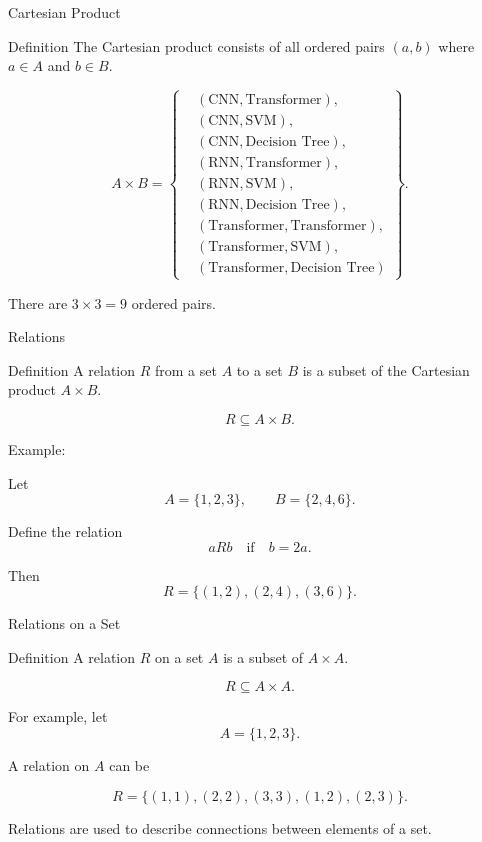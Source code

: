 \documentclass[aspectratio=169]{beamer}
\begin{document}
\begin{frame}{Cartesian Product}
\begin{block}{Definition}
The Cartesian product consists of all ordered pairs $(a,b)$ where $a\in A$ and $b\in B$.
\end{block}

\[
A\times B=
\left\{
\begin{aligned}
&(\text{CNN},\text{Transformer}),\\
&(\text{CNN},\text{SVM}),\\
&(\text{CNN},\text{Decision Tree}),\\
&(\text{RNN},\text{Transformer}),\\
&(\text{RNN},\text{SVM}),\\
&(\text{RNN},\text{Decision Tree}),\\
&(\text{Transformer},\text{Transformer}),\\
&(\text{Transformer},\text{SVM}),\\
&(\text{Transformer},\text{Decision Tree})
\end{aligned}
\right\}.
\]

There are $3\times3=9$ ordered pairs.
\end{frame}
\begin{frame}{Relations}
\begin{block}{Definition}
A relation $R$ from a set $A$ to a set $B$ is a subset of the Cartesian product $A\times B$.
\end{block}

\[
R\subseteq A\times B.
\]

Example:

Let
\[
A=\{1,2,3\},\qquad B=\{2,4,6\}.
\]

Define the relation
\[
aRb\quad\text{if}\quad b=2a.
\]

Then
\[
R=\{(1,2),(2,4),(3,6)\}.
\]
\end{frame}

\begin{frame}{Relations on a Set}
\begin{block}{Definition}
A relation $R$ on a set $A$ is a subset of $A\times A$.
\end{block}

\[
R\subseteq A\times A.
\]

For example, let
\[
A=\{1,2,3\}.
\]

A relation on $A$ can be

\[
R=\{(1,1),(2,2),(3,3),(1,2),(2,3)\}.
\]

Relations are used to describe connections between elements of a set.
\end{frame}
\end{document}
